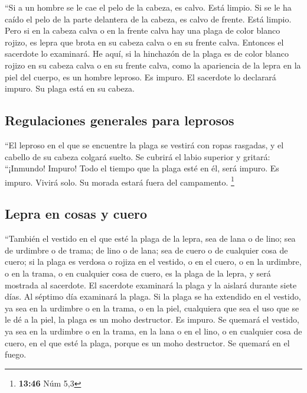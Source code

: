 \begin{paracol}{2}
 ``Si a un hombre se le cae el pelo de la cabeza, es
calvo. Está limpio.  Si se le ha caído el pelo de la
parte delantera de la cabeza, es calvo de frente. Está limpio.
 Pero si en la cabeza calva o en la frente calva hay una
plaga de color blanco rojizo, es lepra que brota en su cabeza calva o en
su frente calva.  Entonces el sacerdote lo examinará. He
aquí, si la hinchazón de la plaga es de color blanco rojizo en su cabeza
calva o en su frente calva, como la apariencia de la lepra en la piel
del cuerpo,  es un hombre leproso. Es impuro. El
sacerdote lo declarará impuro. Su plaga está en su cabeza.

\hypertarget{regulaciones-generales-para-leprosos}{%
\subsection{Regulaciones generales para
leprosos}\label{regulaciones-generales-para-leprosos}}

 ``El leproso en el que se encuentre la plaga se vestirá
con ropas rasgadas, y el cabello de su cabeza colgará suelto. Se cubrirá
el labio superior y gritará: ``¡Inmundo! Impuro!  Todo el
tiempo que la plaga esté en él, será impuro. Es impuro. Vivirá solo. Su
morada estará fuera del campamento. \footnote{\textbf{13:46} Núm 5,3}

\hypertarget{lepra-en-cosas-y-cuero}{%
\subsection{Lepra en cosas y cuero}\label{lepra-en-cosas-y-cuero}}

 ``También el vestido en el que esté la plaga de la
lepra, sea de lana o de lino;  sea de urdimbre o de
trama; de lino o de lana; sea de cuero o de cualquier cosa de cuero;
 si la plaga es verdosa o rojiza en el vestido, o en el
cuero, o en la urdimbre, o en la trama, o en cualquier cosa de cuero, es
la plaga de la lepra, y será mostrada al sacerdote.  El
sacerdote examinará la plaga y la aislará durante siete días.
 Al séptimo día examinará la plaga. Si la plaga se ha
extendido en el vestido, ya sea en la urdimbre o en la trama, o en la
piel, cualquiera que sea el uso que se le dé a la piel, la plaga es un
moho destructor. Es impuro.  Se quemará el vestido, ya
sea en la urdimbre o en la trama, en la lana o en el lino, o en
cualquier cosa de cuero, en el que esté la plaga, porque es un moho
destructor. Se quemará en el fuego.


\end{paracol}
